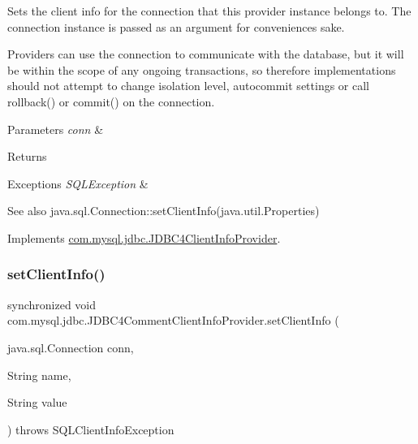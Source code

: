Sets the client info for the connection that this provider instance belongs to. The connection instance is passed as an argument for convenience\textquotesingle{}s sake.

Providers can use the connection to communicate with the database, but it will be within the scope of any ongoing transactions, so therefore implementations should not attempt to change isolation level, autocommit settings or call rollback() or commit() on the connection.


\begin{DoxyParams}{Parameters}
{\em conn} & \\
\hline
\end{DoxyParams}
\begin{DoxyReturn}{Returns}

\end{DoxyReturn}

\begin{DoxyExceptions}{Exceptions}
{\em S\+Q\+L\+Exception} & \\
\hline
\end{DoxyExceptions}
\begin{DoxySeeAlso}{See also}
java.\+sql.\+Connection\+::set\+Client\+Info(java.\+util.\+Properties) 
\end{DoxySeeAlso}


Implements \mbox{\hyperlink{interfacecom_1_1mysql_1_1jdbc_1_1_j_d_b_c4_client_info_provider_ac2ed3391acf830bcb04941654e2cefe3}{com.\+mysql.\+jdbc.\+J\+D\+B\+C4\+Client\+Info\+Provider}}.

\mbox{\label{classcom_1_1mysql_1_1jdbc_1_1_j_d_b_c4_comment_client_info_provider_a00f16e37481cbadcf8b5d8e6267cd54a}} 
\subsubsection{\texorpdfstring{set\+Client\+Info()}{setClientInfo()}\hspace{0.1cm}{\footnotesize\ttfamily [2/2]}}
{\footnotesize\ttfamily synchronized void com.\+mysql.\+jdbc.\+J\+D\+B\+C4\+Comment\+Client\+Info\+Provider.\+set\+Client\+Info (\begin{DoxyParamCaption}\item[{java.\+sql.\+Connection}]{conn,  }\item[{String}]{name,  }\item[{String}]{value }\end{DoxyParamCaption}) throws S\+Q\+L\+Client\+Info\+Exception}

